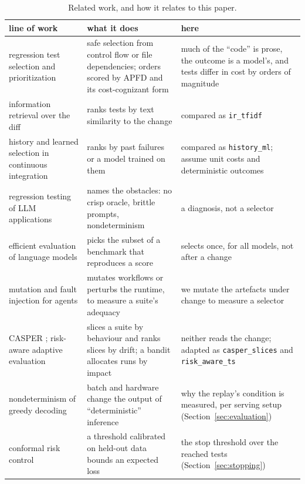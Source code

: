 \documentclass[11pt,a4paper]{article}
\newcommand{\strat}[1]{\texttt{#1}}
\begin{document}
\begin{table}[!htbp]
\centering\small
\caption{Related work, and how it relates to this paper.}
\label{tab:related}
\setlength{\tabcolsep}{4pt}
\begin{tabular}{p{44mm}p{50mm}p{56mm}}
\toprule
line of work & what it does & here \\
\midrule
regression test selection and prioritization \cite{yoo2012regression,rothermel1997safe,rothermel2001prioritizing,elbaum2002family,elbaum2001incorporating,malishevsky2006cost,gligoric2015ekstazi} & safe selection from control flow or file dependencies; orders scored by APFD and its cost-cognizant form & much of the ``code'' is prose, the outcome is a model's, and tests differ in cost by orders of magnitude \\
information retrieval over the diff \cite{saha2015ir} & ranks tests by text similarity to the change & compared as \strat{ir\_tfidf} \\
history and learned selection in continuous integration \cite{elbaum2014techniques,memon2017taming,machalica2019predictive,spieker2017reinforcement,pan2024ltm} & ranks by past failures or a model trained on them & compared as \strat{history\_ml}; assume unit costs and deterministic outcomes \\
regression testing of LLM applications \cite{ma2024prompt} & names the obstacles: no crisp oracle, brittle prompts, nondeterminism & a diagnosis, not a selector \\
efficient evaluation of language models \cite{polo2024tinybenchmarks,li2025atlas,ndzomga2026efficient,wu2026faq} & picks the subset of a benchmark that reproduces a score & selects once, for all models, not after a change \\
mutation and fault injection for agents \cite{kahani2026mutation,tan2026agentchaos,seyedghorban2026llmmas} & mutates workflows or perturbs the runtime, to measure a suite's adequacy & we mutate the artefacts under change to measure a selector \\
CASPER \cite{muse2026casper}; risk-aware adaptive evaluation \cite{maji2026risk} & slices a suite by behaviour and ranks slices by drift; a bandit allocates runs by impact & neither reads the change; adapted as \strat{casper\_slices} and \strat{risk\_aware\_ts} \\
nondeterminism of greedy decoding \cite{yuan2025numerical,atil2024nondeterminism} & batch and hardware change the output of ``deterministic'' inference & why the replay's condition is measured, per serving setup (Section~\ref{sec:evaluation}) \\
conformal risk control \cite{angelopoulos2024conformal,angelopoulos2025ltt} & a threshold calibrated on held-out data bounds an expected loss & the stop threshold over the reached tests (Section~\ref{sec:stopping}) \\
\bottomrule
\end{tabular}
\end{table}
\end{document}
